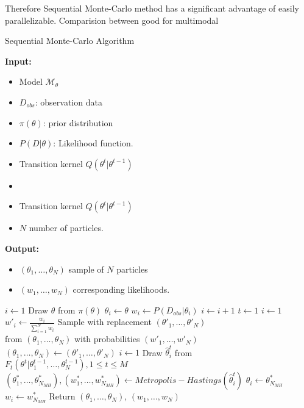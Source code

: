 Therefore Sequential Monte-Carlo method has a significant advantage of easily
parallelizable. Comparision between \cite{daviet2018inference}
good for multimodal
\begin{algorithm}[H]
    \caption{Sequential Monte-Carlo Algorithm}
    \label{alg:smc}
    \hspace*{\algorithmicindent} \textbf{Input:}
    \begin{itemize}
        \item Model $\mathcal{M}_\theta$
        \item $D_{obs}$: observation data
        \item $\pi(\theta)$: prior distribution
        \item $P(D|\theta)$: Likelihood function.
        \item Transition kernel $Q(\theta^t|\theta^{t-1})$
        \item \item Transition kernel $Q(\theta^t|\theta^{t-1})$
        \item $N$ number of particles.
    \end{itemize}
    \hspace*{\algorithmicindent} \textbf{Output:}
    \begin{itemize}
        \item $(\theta_1,\ldots,\theta_N)$ sample of $N$ particles
        \item $(w_1,\ldots,w_N)$ corresponding likelihoods.
    \end{itemize}
    \begin{algorithmic}[1]
        \State $i \leftarrow 1$
         
        \State Draw $\theta$ from $\pi(\theta)$
        \State $\theta_i \leftarrow \theta$
        \State $w_i \leftarrow P(D_{obs}|\theta_i)$
        \State $i \leftarrow i + 1$
        \EndWhile
        \State $t \leftarrow 1$
        \State $i \leftarrow 1$ 
        \State $w'_i \leftarrow \frac{w_i}{\sum_{i=1}^N w_i} $
        \EndWhile
        \State Sample with replacement $(\theta'_1,\ldots,\theta'_N)$  \\\hspace{1.5cm} from $(\theta_1,\ldots,\theta_N)$ with probabilities $(w'_1,\ldots,w'_N)$
        \State $(\theta_1,\ldots,\theta_N) \leftarrow (\theta'_1,\ldots,\theta'_N)$
        \State $i \leftarrow 1$
         
        \State Draw $\hat{\theta}^t_i$ from $F_t(\theta^t | \theta^{t-1}_1,\ldots,\theta^{t-1}_N), 1\leq t \leq M$
        \State $(\theta^*_1,\ldots,\theta^*_{N_{MH}}), (w^*_1,\ldots,w^*_{N_{MH}}) \leftarrow Metropolis-Hastings(\hat{\theta}^t_i)$
        \State $\theta_i \leftarrow \theta^*_{N_{MH}}$
        \State $w_i \leftarrow w^*_{N_{MH}}$
        \EndWhile
        \EndWhile
        \State Return $(\theta_1,\ldots,\theta_{N})$, $(w_1,\ldots,w_{N})$
        \EndProcedure
    \end{algorithmic}
\end{algorithm}
